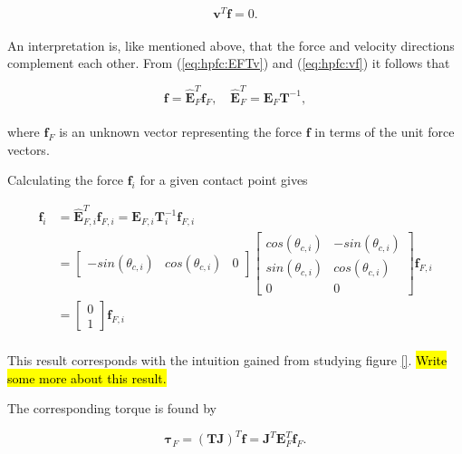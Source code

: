 \begin{equation}\label{eq:hpfc:vf}
    \mathbf{v}^T \mathbf{f} = 0.
\end{equation}
\\
An interpretation is, like mentioned above, that the force and velocity directions complement each other. From (\ref{eq:hpfc:EFTv}) and (\ref{eq:hpfc:vf}) it follows that

\begin{equation}
    \mathbf{f} = \hat{\mathbf{E}}_F^T \mathbf{f}_F, \quad \hat{\mathbf{E}}_F^T = \mathbf{E}_F \mathbf{T}^{-1},
\end{equation}
\\
where $\mathbf{f}_F$ is an unknown vector representing the force $\mathbf{f}$ in terms of the unit force vectors.

Calculating the force $\mathbf{f}_i$ for a given contact point gives

\begin{equation}
    \begin{split}
        \mathbf{f}_i &= \hat{\mathbf{E}}_{F,i}^T \mathbf{f}_{F,i} = \mathbf{E}_{F,i} \mathbf{T}_i^{-1} \mathbf{f}_{F,i}\\
        &=
        \begin{bmatrix}
            -sin(\theta_{c,i}) & cos(\theta_{c,i}) & 0
        \end{bmatrix}
        \begin{bmatrix}
            cos(\theta_{c,i}) & -sin(\theta_{c,i}) \\
            sin(\theta_{c,i}) & cos(\theta_{c,i}) \\
            0 & 0
        \end{bmatrix}
        \mathbf{f}_{F,i}\\
        &=
        \begin{bmatrix}
            0 \\ 1
        \end{bmatrix}
        \mathbf{f}_{F,i}
    \end{split}
\end{equation}
\\
This result corresponds with the intuition gained from studying figure \ref{}. \hl{Write some more about this result.}

The corresponding torque is found by

\begin{equation}
    \boldsymbol{\tau}_F = (\mathbf{TJ})^T \mathbf{f} = \mathbf{J}^T \mathbf{E}_F^T \mathbf{f}_F.
\end{equation}

